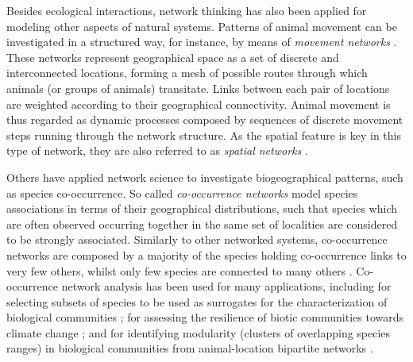 {%
Besides ecological interactions, network thinking has also been applied for modeling other aspects of natural systems.
Patterns of animal movement can be investigated in a structured way, for instance, by means of \textit{movement networks} \cite{Jacoby2016a}.
These networks represent geographical space as a set of discrete and interconnected locations, forming a mesh of possible routes through which animals (or groups of animals) transitate. 
Links between each pair of locations are weighted according to their geographical connectivity.
Animal movement is thus regarded as dynamic processes composed by sequences of discrete movement steps running through the network structure.
As the spatial feature is key in this type of network, they are also referred to as \textit{spatial networks} \cite{Bascompte2007}.
%

Others have applied network science to investigate biogeographical patterns, such as species co-occurrence. 
So called \textit{co-occurrence networks} model species associations in terms of their geographical distributions, such that species which are often observed occurring together in the same set of localities are considered to be strongly associated.
Similarly to other networked systems, co-occurrence networks are composed by a majority of the species holding co-occurrence links to very few others, whilst only few species are connected to many others \cite{Araujo2011a}.
Co-occurrence network analysis has been used for many applications, including for selecting subsets of species to be used as surrogates for the characterization of biological communities \cite{Tulloch2016};
for assessing the resilience of biotic communities towards climate change \cite{Araujo2011a};
and for identifying modularity (clusters of overlapping species ranges) in biological communities from animal-location bipartite networks \cite{Thebault2013}.


}
